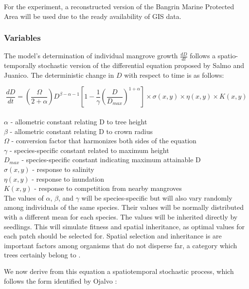 For the experiment, a reconstructed version of the Bangrin Marine Protected Area will be used due to the ready availability of GIS data.

\subsubsection{Variables}
The model's determination of individual mangrove growth $\frac{dD}{dt}$ follows a spatio-temporally stochastic version of the differential equation proposed by Salmo and Juanico. The deterministic change in $D$ with respect to time is as follows:

\begin{equation}
	\frac{dD}{dt} = \left(\frac{\Omega}{2 + \alpha}\right)D^{\beta - \alpha - 1} \left[1 - \frac{1}{\gamma}\left(\frac{D}{D_{max}}\right)^{1 + \alpha}\right] \times \sigma(x,y) \times \eta(x,y) \times K(x,y)
\end{equation}\\
$\alpha$ - allometric constant relating D to tree height\\
$\beta$ - allometric constant relating D to crown radius\\
$\Omega$ - conversion factor that harmonizes both sides of the equation\\
$\gamma$ - species-specific constant related to maximum height\\
$D_{max}$ - species-specific constant indicating maximum attainable D\\
$\sigma(x,y)$ - response to salinity\\
$\eta(x,y)$ - response to inundation\\
$K(x,y)$ - response to competition from nearby mangroves\\

The values of $\alpha$, $\beta$, and $\gamma$ will be species-specific but will also vary randomly among individuals of the same species. Their values will be normally distributed with a different mean for each species. The values will be inherited directly by seedlings. This will simulate fitness and spatial inheritance, as optimal values for each patch should be selected for. Spatial selection and inheritance is are important factors among organisms that do not disperse far, a category which trees certainly belong to \cite{spatialInheritance}. 

We now derive from this equation a spatiotemporal stochastic process, which follows the form identified by Ojalvo \cite{ojalvoColoredNoise}:

